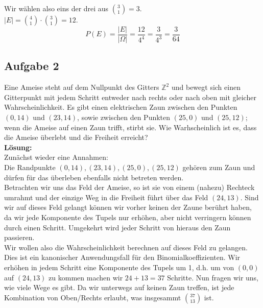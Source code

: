 \documentclass[11pt,a4paper,ngerman]{article}
\begin{document}
Wir wählen also eins der drei aus $\binom{3}{1} = 3$.\\

$\left|E\right| = \binom{4}{1} \cdot \binom{3}{1} = 12$.\\

\[
    P(E) = \frac{\left|E\right|}{\left|\Omega\right|} = \frac{12}{4^4} = \frac{3}{4^3} = \frac{3}{64}
\]

\subsection*{Aufgabe 2}

Eine Ameise steht auf dem Nullpunkt des Gitters $\mathbb{Z}^2$ und bewegt sich einen Gitterpunkt mit jedem Schritt entweder nach rechts oder nach 
oben mit gleicher Wahrscheinlichkeit. Es gibt einen elektrischen Zaun zwischen den Punkten $(0,14)$ und $(23,14)$, sowie zwischen den Punkten $(25,0)$ und
$(25,12)$; wenn die Ameise auf einen Zaun trifft, stirbt sie. Wie Warhscheinlich ist es, dass die Ameise überlebt und die Freiheit erreicht?\\

\textbf{Lösung:}\\

Zunächst wieder eine Annahmen:\\
Die Randpunkte $(0,14), (23,14), (25,0), (25,12)$ gehören zum Zaun und dürfen für das überleben ebenfalls nicht betreten werden.\\

Betrachten wir uns das Feld der Ameise, so ist sie von einem (nahezu) Rechteck umrahmt und der einzige Weg in die Freiheit führt über
das Feld $(24,13)$. Sind wir auf dieses Feld gelangt können wir vorher keinen der Zaune berührt haben, da wir jede Komponente des Tupels nur erhöhen,
aber nicht verringern können durch einen Schritt.
Umgekehrt wird jeder Schritt von hieraus den Zaun passieren.\\

Wir wollen also die Wahrscheinlichkeit berechnen auf dieses Feld zu gelangen.\\
Dies ist ein kanonischer Anwendungsfall für den Binomialkoeffizienten. Wir erhöhen in jedem Schritt eine Komponente des Tupels um 1, d.h.
um von $(0,0)$ auf $(24,13)$ zu kommen machen wir $24+13 = 37$ Schritte. Nun fragen wir uns, wie viele Wege es gibt.
Da wir unterwegs auf keinen Zaun treffen, ist jede Kombination von Oben/Rechts erlaubt, was insgesammt
$ \binom{37}{13} $ ist.\\
\end{document}
